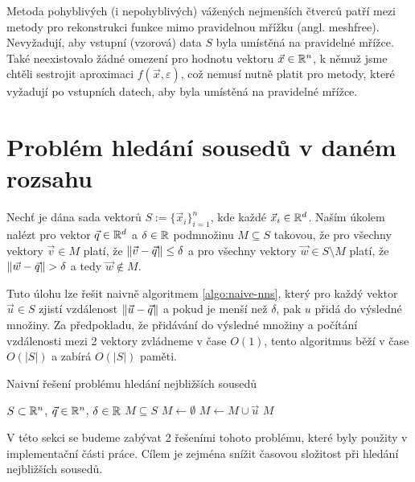 Metoda pohyblivých (i nepohyblivých) vážených nejmenších čtverců patří mezi metody pro rekonstrukci funkce mimo pravidelnou mřížku (angl. meshfree). Nevyžadují, aby vstupní (vzorová) data $S$ byla umístěná na pravidelné mřížce. Také neexistovalo žádné omezení pro hodnotu vektoru $\vec{x} \in \mathbb{R}^n$, k němuž jsme chtěli sestrojit aproximaci $f(\vec{x}, \varepsilon)$, což nemusí nutně platit pro metody, které vyžadují po vstupních datech, aby byla umístěná na pravidelné mřížce.

\section{Problém hledání sousedů v daném rozsahu}

\begin{defi}
  \label{defi:nns}
  Nechť je dána sada vektorů $S := \{\vec{x}_i\}_{i = 1}^n$, kde každé $\vec{x}_i \in \mathbb{R}^d$. Naším úkolem nalézt pro vektor $\vec{q} \in \mathbb{R}^d$ a $\delta \in \mathbb{R}$ podmnožinu $M \subseteq S$ takovou, že pro všechny vektory $\vec{v} \in M$ platí, že $\|\vec{v} - \vec{q}\| \leq \delta$ a pro všechny vektory $\vec{w} \in S \setminus M$ platí, že $\|\vec{w} - \vec{q}\| > \delta$ a tedy $\vec{w} \not\in M$.
\end{defi}

Tuto úlohu lze řešit naivně algoritmem \ref{algo:naive-nns}, který pro každý vektor $\vec{u} \in S$ zjistí vzdálenost $\|\vec{u} - \vec{q}\|$ a pokud je menší než $\delta$, pak $u$ přidá do výsledné množiny. Za předpokladu, že přidávání do výsledné množiny a počítání vzdálenosti mezi 2 vektory zvládneme v čase $O(1)$, tento algoritmus běží v čase $O(|S|)$ a zabírá $O(|S|)$ paměti.

\begin{algorithm}[ht!]
  \caption{Naivní řešení problému hledání nejbližších sousedů}
  \label{algo:naive-nns}
  \begin{algorithmic}
    \Require $S \subset \mathbb{R}^n$, $\vec{q} \in \mathbb{R}^n$, $\delta \in \mathbb{R}$
    \Ensure $M \subseteq S$
    \State $M \leftarrow \emptyset$
          \State $M \leftarrow M \cup \vec{u}$
        \EndIf
    \EndFor
    \Return $M$
  \end{algorithmic}
\end{algorithm}

V této sekci se budeme zabývat 2 řešeními tohoto problému, které byly použity v implementační části práce. Cílem je zejména snížit časovou složitost při hledání nejbližších sousedů.

